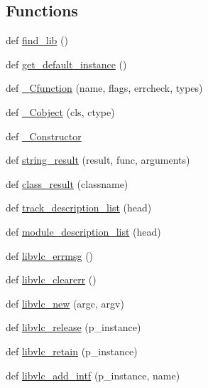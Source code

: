\subsection*{Functions}
\begin{DoxyCompactItemize}
\item 
def \hyperlink{namespacesrc_1_1lib_1_1vlc_a6d261bdc2b350a3701951f953e8b6e81}{find\+\_\+lib} ()
\item 
def \hyperlink{namespacesrc_1_1lib_1_1vlc_a6a608320d8c808c54db01350c09f4320}{get\+\_\+default\+\_\+instance} ()
\item 
def \hyperlink{namespacesrc_1_1lib_1_1vlc_a2095820edc7f80c030c1b44b0bce38de}{\+\_\+\+Cfunction} (name, flags, errcheck, types)
\item 
def \hyperlink{namespacesrc_1_1lib_1_1vlc_acc49cac459879af47b64a480974336f9}{\+\_\+\+Cobject} (cls, ctype)
\item 
def \hyperlink{namespacesrc_1_1lib_1_1vlc_a10b9e1cff9d4c5c5bc491eb9fe63f8e5}{\+\_\+\+Constructor}
\item 
def \hyperlink{namespacesrc_1_1lib_1_1vlc_a5f3a2e66902fe64f68a763328571eaca}{string\+\_\+result} (result, func, arguments)
\item 
def \hyperlink{namespacesrc_1_1lib_1_1vlc_af7eaf30df529645607d2fd412441cdaa}{class\+\_\+result} (classname)
\item 
def \hyperlink{namespacesrc_1_1lib_1_1vlc_a8388a09d90c40d88b72b716118b10040}{track\+\_\+description\+\_\+list} (head)
\item 
def \hyperlink{namespacesrc_1_1lib_1_1vlc_a748235d26f8373f5615af98df67095ba}{module\+\_\+description\+\_\+list} (head)
\item 
def \hyperlink{namespacesrc_1_1lib_1_1vlc_a81e5ea52bba7d8d2969d032def518861}{libvlc\+\_\+errmsg} ()
\item 
def \hyperlink{namespacesrc_1_1lib_1_1vlc_ab01dd7f69ed92f12f1f20956439ce5fa}{libvlc\+\_\+clearerr} ()
\item 
def \hyperlink{namespacesrc_1_1lib_1_1vlc_ad219714c64e99ca3b0f97d0fe59f3109}{libvlc\+\_\+new} (argc, argv)
\item 
def \hyperlink{namespacesrc_1_1lib_1_1vlc_a8c71fa14a7fdeb370f7cb4adbae26614}{libvlc\+\_\+release} (p\+\_\+instance)
\item 
def \hyperlink{namespacesrc_1_1lib_1_1vlc_a88ccb5217517739b5a46763580b8c441}{libvlc\+\_\+retain} (p\+\_\+instance)
\item 
def \hyperlink{namespacesrc_1_1lib_1_1vlc_a51ded63571a552d309a7174e11379eb3}{libvlc\+\_\+add\+\_\+intf} (p\+\_\+instance, name)

\end{DoxyCompactItemize}
